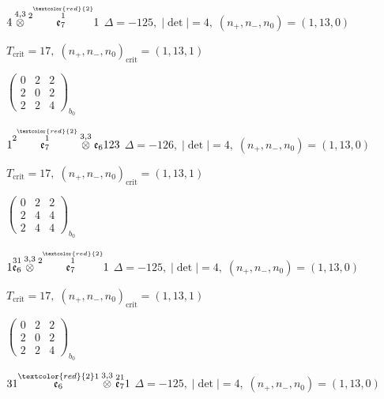 \documentclass[10pt]{article}
\begin{document}
\smallskip

$4\overset{4,3}{\otimes}\overset{2\overset{\textcolor{red}{2}}{1}}{\mathfrak{e}_7}1$ \quad $\Delta=-125,\; |\det|=4,\; (n_+,n_-,n_0)=(1,13,0)$

\hspace{1em}$T_{\text{crit}}=17,\; (n_+,n_-,n_0)_{\text{crit}}=(1,13,1)$

\hspace{2em}$\left(\begin{smallmatrix}0 & 2 & 2 \\ 2 & 0 & 2 \\ 2 & 2 & 4\end{smallmatrix}\right)_{\!b_0}$

\smallskip

$1\overset{2\overset{\textcolor{red}{2}}{1}}{\mathfrak{e}_7}\overset{3,3}{\otimes}\mathfrak{e}_6123$ \quad $\Delta=-126,\; |\det|=4,\; (n_+,n_-,n_0)=(1,13,0)$

\hspace{1em}$T_{\text{crit}}=17,\; (n_+,n_-,n_0)_{\text{crit}}=(1,13,1)$

\hspace{2em}$\left(\begin{smallmatrix}0 & 2 & 2 \\ 2 & 4 & 4 \\ 2 & 4 & 4\end{smallmatrix}\right)_{\!b_0}$

\smallskip

$1\overset{31}{\mathfrak{e}_6}\overset{3,3}{\otimes}\overset{2\overset{\textcolor{red}{2}}{1}}{\mathfrak{e}_7}1$ \quad $\Delta=-125,\; |\det|=4,\; (n_+,n_-,n_0)=(1,13,0)$

\hspace{1em}$T_{\text{crit}}=17,\; (n_+,n_-,n_0)_{\text{crit}}=(1,13,1)$

\hspace{2em}$\left(\begin{smallmatrix}0 & 2 & 2 \\ 2 & 0 & 2 \\ 2 & 2 & 4\end{smallmatrix}\right)_{\!b_0}$

$31\overset{\textcolor{red}{2}1}{\mathfrak{e}_6}\overset{3,3}{\otimes}\overset{21}{\mathfrak{e}_7}1$ \quad $\Delta=-125,\; |\det|=4,\; (n_+,n_-,n_0)=(1,13,0)$
\end{document}
